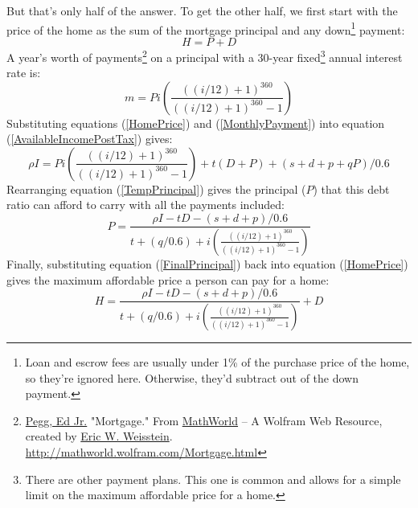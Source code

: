 \documentclass{article}
\begin{document}
But that's only half of the answer. To get the other half, we first
 start with the 
price of the home as the sum of the mortgage principal and any
 down\footnote{
Loan and escrow fees are usually under 1\% of the purchase price of
 the home, so 
they're ignored here. Otherwise, they'd subtract out of the down
 payment.} payment:
\begin{equation}
\label{HomePrice}
H = P + D
\end{equation}
A year's worth of payments\footnote{
\href{http://mathworld.wolfram.com/topics/Pegg.html}{Pegg, Ed Jr.} "Mortgage." From 
\href{http://mathworld.wolfram.com/}{MathWorld} -- A Wolfram Web Resource, created by 
\href{http://mathworld.wolfram.com/about/author.html}{Eric W. Weisstein}. 
\url{http://mathworld.wolfram.com/Mortgage.html}}
 on a principal with a 30-year fixed\footnote{
There are other payment plans. This one is common and allows
for a simple limit on the maximum affordable price for a home.} 
annual interest rate is:
\begin{equation}
\label{MonthlyPayment}
m = Pi \left( \frac{((i/12) + 1)^{360}}{((i/12) + 1)^{360} - 1} \right)
\end{equation}
Substituting equations (\ref{HomePrice}) and (\ref{MonthlyPayment}) into 
equation (\ref{AvailableIncomePostTax}) gives:
\begin{equation}
\label{TempPrincipal}
\rho I = P i \left( \frac{((i/12) + 1)^{360}}{((i/12) + 1)^{360} - 1} \right)
+ t(D + P) + (s + d + p + qP) / 0.6
\end{equation}
Rearranging equation (\ref{TempPrincipal}) gives the principal ($P$) that 
this debt ratio can afford to carry with all the payments included:
\begin{equation}
\label{FinalPrincipal}
P = \frac{\rho I - tD - (s + d + p) / 0.6}{t + (q / 0.6) +
i \left( \frac{((i/12) + 1)^{360}}{((i/12) + 1)^{360} - 1} \right)}
\end{equation}
Finally, substituting equation (\ref{FinalPrincipal}) back into equation
 (\ref{HomePrice}) gives the maximum affordable price a person can pay 
for a home:
\begin{equation}
\label{FinalHomePrice}
H = \frac{\rho I - tD - (s + d + p) / 0.6}{t + (q / 0.6) +
i \left( \frac{((i/12) + 1)^{360}}{((i/12) + 1)^{360} - 1} \right)} + D
\end{equation}
\end{document}
